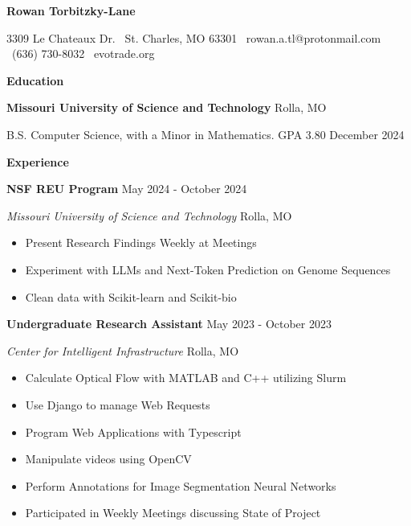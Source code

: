 \documentclass[11pt]{article}
\begin{document}
\begin{center}
    \textbf{\huge Rowan Torbitzky-Lane}\\
    \hrulefill
\end{center}

\begin{center}
    3309 Le Chateaux Dr. \textbullet \ St. Charles, MO 63301 \textbullet \ rowan.a.tl@protonmail.com \textbullet \ (636) 730-8032 \textbullet \ evotrade.org
\end{center}


\begin{center}
    \textbf{Education}
\end{center}
\textbf{Missouri University of Science and Technology} \hfill Rolla, MO

B.S. Computer Science, with a Minor in Mathematics. GPA 3.80 \hfill December 2024


\begin{center}
    \textbf{Experience}
\end{center}

\textbf{NSF REU Program} \hfill May 2024 - October 2024

\textsl{Missouri University of Science and Technology} \hfill Rolla, MO
\begin{itemize}[noitemsep]
    \item Present Research Findings Weekly at Meetings
    \item Experiment with LLMs and Next-Token Prediction on Genome Sequences
    \item Clean data with Scikit-learn and Scikit-bio
\end{itemize}

\textbf{Undergraduate Research Assistant} \hfill May 2023 - October 2023

\textsl{Center for Intelligent Infrastructure} \hfill Rolla, MO
\begin{itemize}[noitemsep]
    \item Calculate Optical Flow with MATLAB and C++ utilizing Slurm
    \item Use Django to manage Web Requests
    \item Program Web Applications with Typescript
    \item Manipulate videos using OpenCV
    \item Perform Annotations for Image Segmentation Neural Networks
    \item Participated in Weekly Meetings discussing State of Project
\end{itemize}
\end{document}
